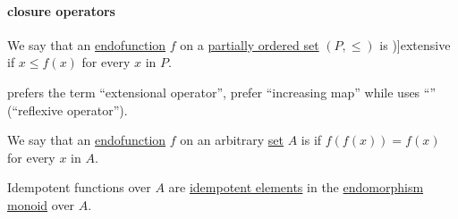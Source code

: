 \paragraph{closure operators}

\begin{definition}\label{def:extensive_function}
  We say that an \hyperref[def:endofunction]{endofunction} \( f \) on a \hyperref[def:partially_ordered_set]{partially ordered set} \( (P, \leq) \) is \term[en=extensive (\cite[111]{Birkhoff1967LatticeTheory})]{extensive} if \( x \leq f(x) \) for every \( x \) in \( P \).
\end{definition}
\begin{comments}
  \item \Textcite[def. 1.8.5]{Harzheim2005OrderedSets} prefers the term \enquote{extensional operator}, \textcite[186]{DaveyPriestley2002LatticeTheory} prefer \enquote{increasing map} while \textcite[def. 2.12]{Гуров2013ТеорияРешёток} uses \enquote{} (\enquote{reflexive operator}).
\end{comments}

\begin{definition}\label{def:idempotent_function}
  We say that an \hyperref[def:endofunction]{endofunction} \( f \) on an arbitrary \hyperref[def:set]{set} \( A \) is  if \( f(f(x)) = f(x) \) for every \( x \) in \( A \).
\end{definition}
\begin{comments}
  \item Idempotent functions over \( A \) are \hyperref[def:monoid_idempotent]{idempotent elements} in the \hyperref[def:endomorphism_monoid]{endomorphism monoid} over \( A \).
\end{comments}

